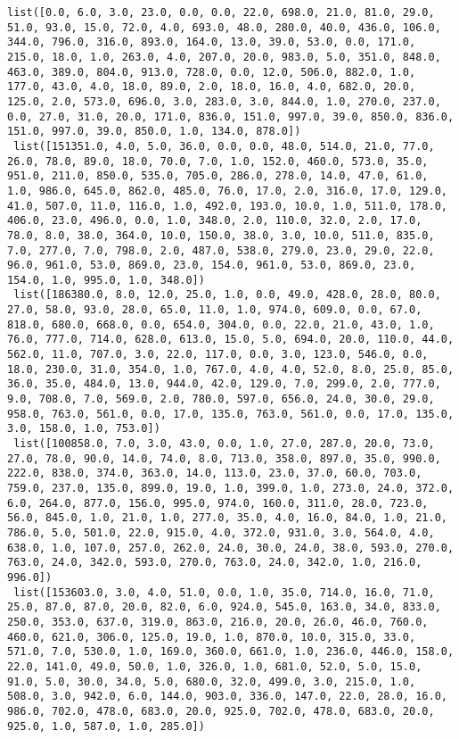 \documentclass[11pt]{article}
\begin{document}
\begin{Verbatim}[commandchars=\\\{\}]
 list([0.0, 6.0, 3.0, 23.0, 0.0, 0.0, 22.0, 698.0, 21.0, 81.0, 29.0, 51.0, 93.0, 15.0, 72.0, 4.0, 693.0, 48.0, 280.0, 40.0, 436.0, 106.0, 344.0, 796.0, 316.0, 893.0, 164.0, 13.0, 39.0, 53.0, 0.0, 171.0, 215.0, 18.0, 1.0, 263.0, 4.0, 207.0, 20.0, 983.0, 5.0, 351.0, 848.0, 463.0, 389.0, 804.0, 913.0, 728.0, 0.0, 12.0, 506.0, 882.0, 1.0, 177.0, 43.0, 4.0, 18.0, 89.0, 2.0, 18.0, 16.0, 4.0, 682.0, 20.0, 125.0, 2.0, 573.0, 696.0, 3.0, 283.0, 3.0, 844.0, 1.0, 270.0, 237.0, 0.0, 27.0, 31.0, 20.0, 171.0, 836.0, 151.0, 997.0, 39.0, 850.0, 836.0, 151.0, 997.0, 39.0, 850.0, 1.0, 134.0, 878.0])
 list([151351.0, 4.0, 5.0, 36.0, 0.0, 0.0, 48.0, 514.0, 21.0, 77.0, 26.0, 78.0, 89.0, 18.0, 70.0, 7.0, 1.0, 152.0, 460.0, 573.0, 35.0, 951.0, 211.0, 850.0, 535.0, 705.0, 286.0, 278.0, 14.0, 47.0, 61.0, 1.0, 986.0, 645.0, 862.0, 485.0, 76.0, 17.0, 2.0, 316.0, 17.0, 129.0, 41.0, 507.0, 11.0, 116.0, 1.0, 492.0, 193.0, 10.0, 1.0, 511.0, 178.0, 406.0, 23.0, 496.0, 0.0, 1.0, 348.0, 2.0, 110.0, 32.0, 2.0, 17.0, 78.0, 8.0, 38.0, 364.0, 10.0, 150.0, 38.0, 3.0, 10.0, 511.0, 835.0, 7.0, 277.0, 7.0, 798.0, 2.0, 487.0, 538.0, 279.0, 23.0, 29.0, 22.0, 96.0, 961.0, 53.0, 869.0, 23.0, 154.0, 961.0, 53.0, 869.0, 23.0, 154.0, 1.0, 995.0, 1.0, 348.0])
 list([186380.0, 8.0, 12.0, 25.0, 1.0, 0.0, 49.0, 428.0, 28.0, 80.0, 27.0, 58.0, 93.0, 28.0, 65.0, 11.0, 1.0, 974.0, 609.0, 0.0, 67.0, 818.0, 680.0, 668.0, 0.0, 654.0, 304.0, 0.0, 22.0, 21.0, 43.0, 1.0, 76.0, 777.0, 714.0, 628.0, 613.0, 15.0, 5.0, 694.0, 20.0, 110.0, 44.0, 562.0, 11.0, 707.0, 3.0, 22.0, 117.0, 0.0, 3.0, 123.0, 546.0, 0.0, 18.0, 230.0, 31.0, 354.0, 1.0, 767.0, 4.0, 4.0, 52.0, 8.0, 25.0, 85.0, 36.0, 35.0, 484.0, 13.0, 944.0, 42.0, 129.0, 7.0, 299.0, 2.0, 777.0, 9.0, 708.0, 7.0, 569.0, 2.0, 780.0, 597.0, 656.0, 24.0, 30.0, 29.0, 958.0, 763.0, 561.0, 0.0, 17.0, 135.0, 763.0, 561.0, 0.0, 17.0, 135.0, 3.0, 158.0, 1.0, 753.0])
 list([100858.0, 7.0, 3.0, 43.0, 0.0, 1.0, 27.0, 287.0, 20.0, 73.0, 27.0, 78.0, 90.0, 14.0, 74.0, 8.0, 713.0, 358.0, 897.0, 35.0, 990.0, 222.0, 838.0, 374.0, 363.0, 14.0, 113.0, 23.0, 37.0, 60.0, 703.0, 759.0, 237.0, 135.0, 899.0, 19.0, 1.0, 399.0, 1.0, 273.0, 24.0, 372.0, 6.0, 264.0, 877.0, 156.0, 995.0, 974.0, 160.0, 311.0, 28.0, 723.0, 56.0, 845.0, 1.0, 21.0, 1.0, 277.0, 35.0, 4.0, 16.0, 84.0, 1.0, 21.0, 786.0, 5.0, 501.0, 22.0, 915.0, 4.0, 372.0, 931.0, 3.0, 564.0, 4.0, 638.0, 1.0, 107.0, 257.0, 262.0, 24.0, 30.0, 24.0, 38.0, 593.0, 270.0, 763.0, 24.0, 342.0, 593.0, 270.0, 763.0, 24.0, 342.0, 1.0, 216.0, 996.0])
 list([153603.0, 3.0, 4.0, 51.0, 0.0, 1.0, 35.0, 714.0, 16.0, 71.0, 25.0, 87.0, 87.0, 20.0, 82.0, 6.0, 924.0, 545.0, 163.0, 34.0, 833.0, 250.0, 353.0, 637.0, 319.0, 863.0, 216.0, 20.0, 26.0, 46.0, 760.0, 460.0, 621.0, 306.0, 125.0, 19.0, 1.0, 870.0, 10.0, 315.0, 33.0, 571.0, 7.0, 530.0, 1.0, 169.0, 360.0, 661.0, 1.0, 236.0, 446.0, 158.0, 22.0, 141.0, 49.0, 50.0, 1.0, 326.0, 1.0, 681.0, 52.0, 5.0, 15.0, 91.0, 5.0, 30.0, 34.0, 5.0, 680.0, 32.0, 499.0, 3.0, 215.0, 1.0, 508.0, 3.0, 942.0, 6.0, 144.0, 903.0, 336.0, 147.0, 22.0, 28.0, 16.0, 986.0, 702.0, 478.0, 683.0, 20.0, 925.0, 702.0, 478.0, 683.0, 20.0, 925.0, 1.0, 587.0, 1.0, 285.0])

\end{Verbatim}
\end{document}
